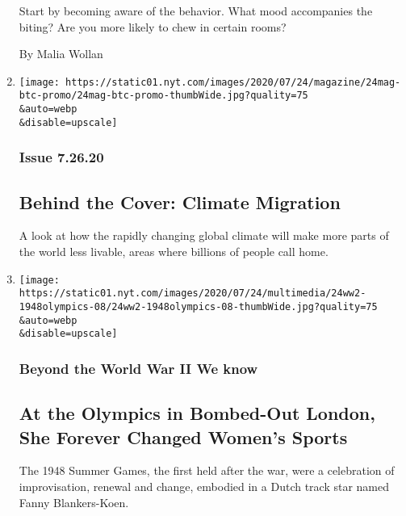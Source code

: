 \begin{enumerate}
  Start by becoming aware of the behavior. What mood accompanies the
  biting? Are you more likely to chew in certain rooms?

  By Malia Wollan
\item
  \href{/2020/07/24/magazine/behind-the-cover-climate-migration.html}{}

  \texttt{[image: https://static01.nyt.com/images/2020/07/24/magazine/24mag-btc-promo/24mag-btc-promo-thumbWide.jpg?quality=75\\\&auto=webp\\\&disable=upscale]}

  \hypertarget{issue-72620}{%
  \subsubsection{Issue 7.26.20}\label{issue-72620}}

  \hypertarget{behind-the-cover-climate-migration}{%
  \subsection{Behind the Cover: Climate
  Migration}\label{behind-the-cover-climate-migration}}

  A look at how the rapidly changing global climate will make more parts
  of the world less livable, areas where billions of people call home.
\item
  \href{/2020/07/24/magazine/1948-olympics-fanny-blankers-koen.html}{}

  \texttt{[image: https://static01.nyt.com/images/2020/07/24/multimedia/24ww2-1948olympics-08/24ww2-1948olympics-08-thumbWide.jpg?quality=75\\\&auto=webp\\\&disable=upscale]}

  \hypertarget{beyond-the-world-war-ii-we-know-1}{%
  \subsubsection{Beyond the World War II We
  know}\label{beyond-the-world-war-ii-we-know-1}}

  \hypertarget{at-the-olympics-in-bombed-out-london-she-forever-changed-womens-sports}{%
  \subsection{At the Olympics in Bombed-Out London, She Forever Changed
  Women's
  Sports}\label{at-the-olympics-in-bombed-out-london-she-forever-changed-womens-sports}}

  The 1948 Summer Games, the first held after the war, were a
  celebration of improvisation, renewal and change, embodied in a Dutch
  track star named Fanny Blankers-Koen.


\end{enumerate}
